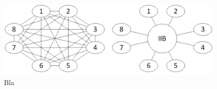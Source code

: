 \documentclass[11pt]{article}
\begin{document}
    \begin{figure}[h]
        \includegraphics[width=\linewidth]{media/Broker.png}
        \caption{Bla}\label{blubber}
    \end{figure}
\end{document}
